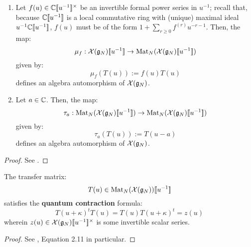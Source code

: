         \begin{lemma} \label{lemma: automorphisms_of_extended_untwisted_yangians}
            \begin{enumerate}
                \item Let $f(u) \in \bbC[\![u^{-1}]\!]^{\x}$ be an invertible formal power series in $u^{-1}$; recall that, because $\mathbb{C}[\![u^{-1}]\!]$ is a local commutative ring with (unique) maximal ideal $u^{-1}\mathbb{C}[\![u^{-1}]\!]$, $f(u)$ must be of the form $1 + \sum_{r \geq 0} f^{(r)} u^{-r - 1}$. Then, the map:
                    $$\mu_f: \mathcal{X}(\mathfrak{g}_N)[\![u^{-1}]\!] \to \operatorname{Mat}_N(\mathcal{X}(\mathfrak{g}_N)[\![u^{-1}]\!])$$
                given by:
                    $$\mu_f( T(u) ) := f(u) T(u)$$
                defines an algebra automorphism of $\mathcal{X}(\mathfrak{g}_N)$.
                \item Let $a \in \mathbb{C}$. Then, the map:
                    $$\tau_a: \operatorname{Mat}_N(\mathcal{X}(\mathfrak{g}_N)[\![u^{-1}]\!]) \to \operatorname{Mat}_N(\mathcal{X}(\mathfrak{g}_N)[\![u^{-1}]\!])$$
                given by:
                    $$\tau_a( T(u) ) := T(u - a)$$
                defines an algebra automorphism of $\mathcal{X}(\mathfrak{g}_N)$.
            \end{enumerate}
        \end{lemma}
            \begin{proof}
                See \cite[Section 2]{guay_regelskis_twisted_yangians_for_symmetric_pairs_of_types_BCD}.
            \end{proof}

        \begin{lemma} \label{lemma: quantum_contractions}
            The transfer matrix:
                $$T(u) \in \operatorname{Mat}_N( \mathcal{X}(\mathfrak{g}_N) )[\![u^{-1}]\!]$$
            satisfies the \textbf{quantum contraction} formula:
                \begin{equation} \label{equation: quantum_contraction}
                    T(u + \kappa)^t T(u) = T(u) T(u + \kappa)^t = z(u)
                \end{equation}
            wherein $z(u) \in \calX(\g_N)[\![u^{-1}]\!]^{\x}$ is some invertible scalar series.
        \end{lemma}
            \begin{proof}
                See \cite[Section 2]{guay_regelskis_twisted_yangians_for_symmetric_pairs_of_types_BCD}, Equation 2.11 in particular.
            \end{proof}
            
